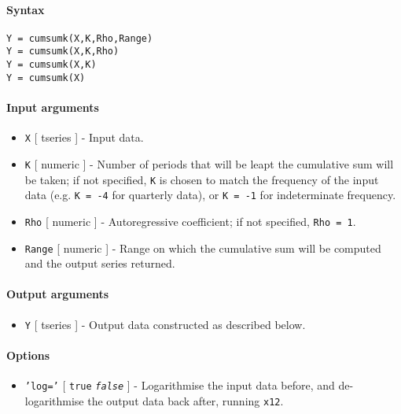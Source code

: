 


	\paragraph{Syntax}

\begin{verbatim}
Y = cumsumk(X,K,Rho,Range)
Y = cumsumk(X,K,Rho)
Y = cumsumk(X,K)
Y = cumsumk(X)
\end{verbatim}

\paragraph{Input arguments}

\begin{itemize}
\item
  \texttt{X} {[} tseries {]} - Input data.
\item
  \texttt{K} {[} numeric {]} - Number of periods that will be leapt the
  cumulative sum will be taken; if not specified, \texttt{K} is chosen
  to match the frequency of the input data (e.g. \texttt{K = -4} for
  quarterly data), or \texttt{K = -1} for indeterminate frequency.
\item
  \texttt{Rho} {[} numeric {]} - Autoregressive coefficient; if not
  specified, \texttt{Rho = 1}.
\item
  \texttt{Range} {[} numeric {]} - Range on which the cumulative sum
  will be computed and the output series returned.
\end{itemize}

\paragraph{Output arguments}

\begin{itemize}
\itemsep1pt\parskip0pt
\item
  \texttt{Y} {[} tseries {]} - Output data constructed as described
  below.
\end{itemize}

\paragraph{Options}

\begin{itemize}
\itemsep1pt\parskip0pt
\item
  \texttt{'log='} {[} \texttt{true} \textbar{} \emph{\texttt{false}} {]}
  - Logarithmise the input data before, and de-logarithmise the output
  data back after, running \texttt{x12}.
\end{itemize}

